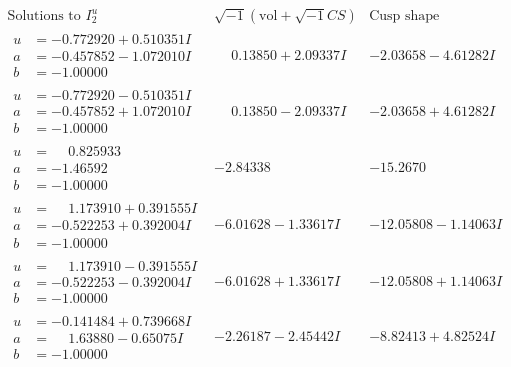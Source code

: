 \documentclass[1p]{elsarticle_modified}
\theoremstyle{definition}
\newcommand{\I}{\sqrt{-1}}
\begin{document}
$$\begin{array}{c|c|c}  
\text{Solutions to }I^u_{2}& \I (\text{vol} + \sqrt{-1}CS) & \text{Cusp shape}\\
 \hline 
\begin{aligned}
u &= -0.772920 + 0.510351 I \\
a &= -0.457852 - 1.072010 I \\
b &= -1.00000\phantom{ +0.000000I}\end{aligned}
 & \phantom{-}0.13850 + 2.09337 I & -2.03658 - 4.61282 I \\ \hline\begin{aligned}
u &= -0.772920 - 0.510351 I \\
a &= -0.457852 + 1.072010 I \\
b &= -1.00000\phantom{ +0.000000I}\end{aligned}
 & \phantom{-}0.13850 - 2.09337 I & -2.03658 + 4.61282 I \\ \hline\begin{aligned}
u &= \phantom{-}0.825933\phantom{ +0.000000I} \\
a &= -1.46592\phantom{ +0.000000I} \\
b &= -1.00000\phantom{ +0.000000I}\end{aligned}
 & -2.84338\phantom{ +0.000000I} & -15.2670\phantom{ +0.000000I} \\ \hline\begin{aligned}
u &= \phantom{-}1.173910 + 0.391555 I \\
a &= -0.522253 + 0.392004 I \\
b &= -1.00000\phantom{ +0.000000I}\end{aligned}
 & -6.01628 - 1.33617 I & -12.05808 - 1.14063 I \\ \hline\begin{aligned}
u &= \phantom{-}1.173910 - 0.391555 I \\
a &= -0.522253 - 0.392004 I \\
b &= -1.00000\phantom{ +0.000000I}\end{aligned}
 & -6.01628 + 1.33617 I & -12.05808 + 1.14063 I \\ \hline\begin{aligned}
u &= -0.141484 + 0.739668 I \\
a &= \phantom{-}1.63880 - 0.65075 I \\
b &= -1.00000\phantom{ +0.000000I}\end{aligned}
 & -2.26187 - 2.45442 I & -8.82413 + 4.82524 I \\ \hline\begin{aligned}

\end{aligned}
\end{array}$$
\end{document}
